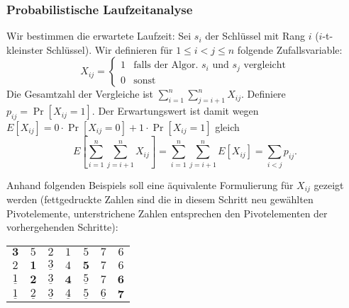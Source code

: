 \subsubsection{Probabilistische Laufzeitanalyse}
Wir bestimmen die erwartete Laufzeit: Sei $s_i$ der Schlüssel mit Rang $i$
($i$-t-kleinster Schlüssel). Wir definieren für $1 \leq i < j \leq n$ folgende
Zufallsvariable:
\[
  X_{ij} = \begin{cases} 1 & \text{falls der Algor. $s_i$ und $s_j$ vergleicht} \\
	  0 & \text{sonst} \end{cases}
\]
Die Gesamtzahl der Vergleiche ist $\sum_{i=1}^n \sum_{j=i+1}^n X_{ij}$.
Definiere $p_{ij} = \Pr\left[X_{ij} = 1\right]$. Der Erwartungswert ist damit
wegen $E\left[X_{ij}\right] = 0 \cdot \Pr\left[X_{ij} = 0\right] + 1 \cdot
\Pr\left[X_{ij} = 1\right]$ gleich
\[
  E\left[\sum_{i=1}^n \sum_{j=i+1}^n X_{ij}\right] = \sum_{i=1}^n
  \sum_{j=i+1}^n E\left[X_{ij}\right] = \sum_{i<j} p_{ij}.
\]

Anhand folgenden Beispiels soll eine äquivalente Formulierung für $X_{ij}$
gezeigt werden (fettgedruckte Zahlen sind die in diesem Schritt neu gewählten
Pivotelemente, unterstrichene Zahlen entsprechen den Pivotelementen der
vorhergehenden Schritte):

\vspace{0.5cm}
\begin{minipage}{0.6\linewidth}
\renewcommand\arraystretch{1.3}
\centering
\begin{tabular}{ccccccc}
	$\mathbf{3}$ & $5$ & $2$ & $1$ & $5$ & $7$ & $6$ \\
	$2$ & $\mathbf{1}$ & $\underline{3}$ & $4$ & $\mathbf{5}$ & $7$ & $6$ \\
	$\underline{1}$ & $\mathbf{2}$ & $\underline{3}$ & $\mathbf{4}$ & $\underline{5}$ & $7$ & $\mathbf{6}$ \\
	$\underline{1}$ & $\underline{2}$ & $\underline{3}$ & $\underline{4}$ & $\underline{5}$ & $\underline{6}$ & $\mathbf{7}$
\end{tabular}
\end{minipage}\hfill\begin{minipage}{0.3\linewidth}
\end{minipage}
\vspace{0.5cm}

